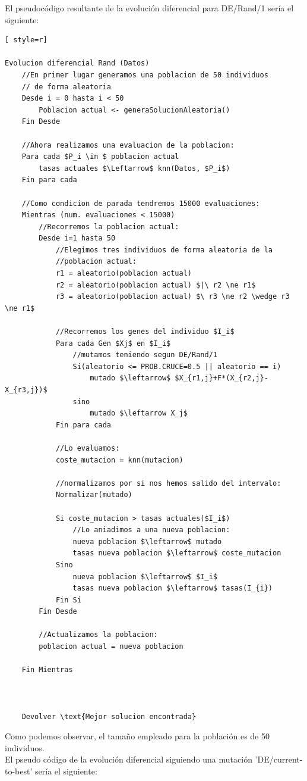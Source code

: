 El pseudocódigo resultante de la evolución diferencial para DE/Rand/1 sería el siguiente:
\begin{lstlisting}[ style=r]

Evolucion diferencial Rand (Datos)
	//En primer lugar generamos una poblacion de 50 individuos
	// de forma aleatoria
	Desde i = 0 hasta i < 50
		Poblacion actual <- generaSolucionAleatoria()
	Fin Desde
	
	//Ahora realizamos una evaluacion de la poblacion:
	Para cada $P_i \in $ poblacion actual
		tasas actuales $\Leftarrow$ knn(Datos, $P_i$)
	Fin para cada
	
	//Como condicion de parada tendremos 15000 evaluaciones:
	Mientras (num. evaluaciones < 15000)
		//Recorremos la poblacion actual:
		Desde i=1 hasta 50
			//Elegimos tres individuos de forma aleatoria de la
			//poblacion actual:
			r1 = aleatorio(poblacion actual)
			r2 = aleatorio(poblacion actual) $|\ r2 \ne r1$
			r3 = aleatorio(poblacion actual) $\ r3 \ne r2 \wedge r3 \ne r1$
			
			//Recorremos los genes del individuo $I_i$
			Para cada Gen $Xj$ en $I_i$
				//mutamos teniendo segun DE/Rand/1
				Si(aleatorio <= PROB.CRUCE=0.5 || aleatorio == i)
					mutado $\leftarrow$ $X_{r1,j}+F*(X_{r2,j}-X_{r3,j})$
				sino
					mutado $\leftarrow X_j$
			Fin para cada
			
			//Lo evaluamos:
			coste_mutacion = knn(mutacion)
			
			//normalizamos por si nos hemos salido del intervalo:
			Normalizar(mutado)
			
			Si coste_mutacion > tasas actuales($I_i$)
				//Lo aniadimos a una nueva poblacion:
				nueva poblacion $\leftarrow$ mutado
				tasas nueva poblacion $\leftarrow$ coste_mutacion
			Sino
				nueva poblacion $\leftarrow$ $I_i$
				tasas nueva poblacion $\leftarrow$ tasas(I_{i})
			Fin Si
		Fin Desde
		
		//Actualizamos la poblacion:
		poblacion actual = nueva poblacion
		
	Fin Mientras
	
	
	
	Devolver \text{Mejor solucion encontrada}	
\end{lstlisting}

Como podemos observar, el tamaño empleado para la población es de 50 individuos.\\ 
El pseudo código de la evolución diferencial siguiendo una mutación 'DE/current-to-best' sería el siguiente:

